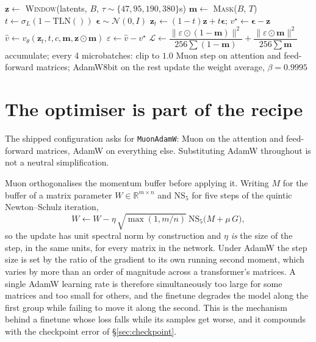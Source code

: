 \documentclass[10pt,twocolumn,letterpaper]{article}
\newcommand{\bz}{\mathbf{z}}
\newcommand{\bm}{\mathbf{m}}
\newcommand{\bef}{\boldsymbol{\epsilon}}
\begin{document}
\begin{algorithm}[t]
\caption{One training step}
\label{alg:step}
\begin{algorithmic}[1]
\State $\bz \gets$ \textsc{Window}(latents, $B$, $\tau \sim \{47,95,190,380\}$s) 
\State $\bm \gets$ \textsc{Mask}($B$, $T$) 
\State $t \gets \sigma_L(1 - \mathrm{TLN}())$ 
\State $\bef \sim \mathcal{N}(0,I)$
\State $\bz_t \gets (1-t)\bz + t\bef$; \quad $v^\star \gets \bef - \bz$
\State $\hat v \gets v_\theta(\bz_t, t, c, \bm, \bz \odot \bm)$ 
\State $\varepsilon \gets \hat v - v^\star$
\State $\mathcal{L} \gets \dfrac{\|\varepsilon\odot(1-\bm)\|^2}{256\sum(1-\bm)}
                     + \dfrac{\|\varepsilon\odot\bm\|^2}{256\sum\bm}$ 
\State accumulate; every 4 microbatches: clip to $1.0$
\State Muon step on attention and feed-forward matrices; AdamW8bit on the rest
\State update the weight average, $\beta = 0.9995$
\end{algorithmic}
\end{algorithm}

\section{The optimiser is part of the recipe}
\label{sec:opt}

The shipped configuration asks for \texttt{MuonAdamW}: Muon on the attention and
feed-forward matrices, AdamW on everything else. Substituting AdamW throughout is
not a neutral simplification.

Muon orthogonalises the momentum buffer before applying it. Writing $M$ for the
buffer of a matrix parameter $W \in \mathbb{R}^{m\times n}$ and $\mathrm{NS}_5$
for five steps of the quintic Newton--Schulz iteration,
\begin{equation}
W \leftarrow W - \eta\,\sqrt{\max(1, m/n)}\ \mathrm{NS}_5\!\big(M + \mu\,G\big),
\label{eq:muon}
\end{equation}
so the update has unit spectral norm by construction and $\eta$ \emph{is} the size
of the step, in the same units, for every matrix in the network. Under AdamW the
step size is set by the ratio of the gradient to its own running second moment,
which varies by more than an order of magnitude across a transformer's matrices.
A single AdamW learning rate is therefore simultaneously too large for some
matrices and too small for others, and the finetune degrades the model along the
first group while failing to move it along the second. This is the mechanism
behind a finetune whose loss falls while its samples get worse, and it compounds
with the checkpoint error of \S\ref{sec:checkpoint}.
\end{document}
